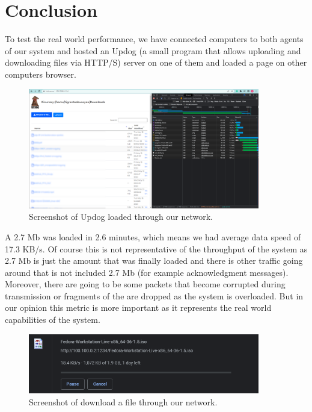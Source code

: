 \chapter{Conclusion}

To test the real world performance, we have connected computers to both agents of our system and hosted an Updog (a small program that allows uploading and downloading files via HTTP/S) server on one of them and loaded a page on other computers browser.

\begin{figure}[H]
\begin{center}
\includegraphics[width=0.90\textwidth]{updog-2.png}
\end{center}
\caption{Screenshot of Updog loaded through our network.}
\label{updog}
\end{figure}

A 2.7 Mb was loaded in 2.6 minutes, which means we had average data speed of 17.3 KB/s. Of course this is not representative of the throughput of the system as 2.7 Mb is just the amount that was finally loaded and there is other traffic going around that is not included 2.7 Mb (for example acknowledgment messages). Moreover, there are going to be some packets that become corrupted during transmission or fragments of the are dropped as the system is overloaded. But in our opinion this metric is more important as it represents the real world capabilities of the system.   

\begin{figure}[H]
\begin{center}
\includegraphics[width=0.90\textwidth]{download.png}
\end{center}
\caption{Screenshot of download a file through our network.}
\label{download}
\end{figure}

